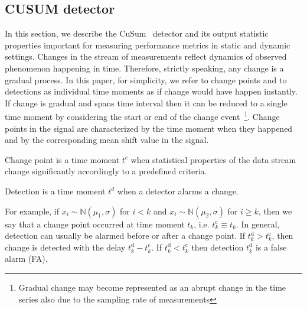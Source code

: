 \documentclass[doctoral,utf8,lot,loar,lof,shortloft,index]{jydiss}
\begin{document}
\subsection{CUSUM detector}

In this section, we describe the CuSum~\cite{Page1954} detector and its output statistic properties important for measuring performance metrics in static and dynamic settings.
Changes in the stream of measurements reflect dynamics of observed phenomenon happening in time.
Therefore, strictly speaking, any change is a gradual process.
In this paper, for simplicity, we refer to change points and to detections as individual time moments as if change would have happen instantly. If change is gradual and spans time interval then it can be reduced to a single time moment by considering the start or end of the change event~\footnote{Gradual change may become represented as an abrupt change in the time series also due to the sampling rate of measurements}.
Change points in the signal are characterized by the time moment when they happened and by the corresponding mean shift value in the signal.
\begin{definition}
	Change point is a time moment $t^c$ when statistical properties of the data stream change significantly accordingly to a predefined criteria.
\end{definition}
\begin{definition}
	Detection is a time moment $t^d$ when a detector alarms a change.
\end{definition}
For example, if $x_i \sim \mathbb{N}(\mu_1, \sigma)$ for $i < k$ and $x_i \sim \mathbb{N}(\mu_2, \sigma)$ for $i \geq k$,
then we say that a change point occurred at time moment $t_k$, i.e. $t^{\text{c}}_{k} \equiv t_k$.
In general, detection can usually be alarmed before or after a change point.
If $t^{\text{d}}_k > t^{\text{c}}_k$, then change is detected with the delay $t^{\text{d}}_k - t^{\text{c}}_k$.
If $t^{\text{d}}_k < t^{\text{c}}_k$ then detection $t^{\text{d}}_k$ is a false alarm (FA).
\end{document}
